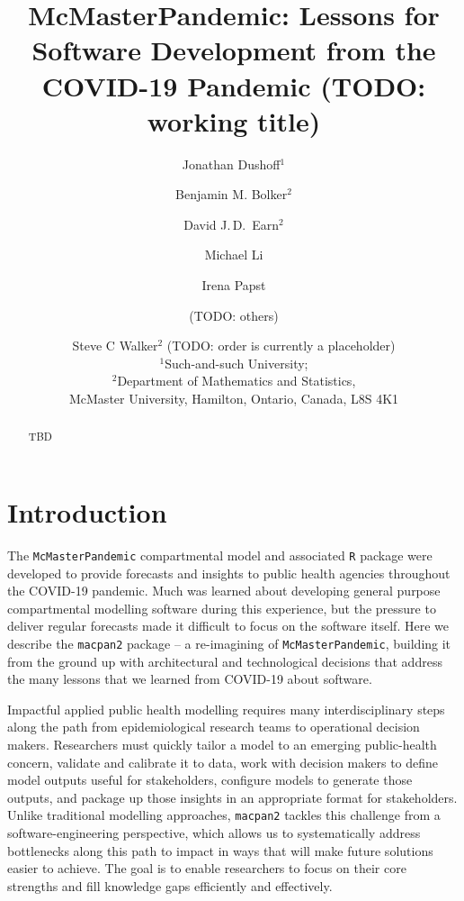 \documentclass[12pt]{article}\usepackage[]{graphicx}\usepackage[]{xcolor}
\title{McMasterPandemic: Lessons for Software Development from the COVID-19 Pandemic (TODO: working title)}
\author{Jonathan Dushoff$^1$ \and Benjamin M. Bolker$^2$ \and David J.\,D.\ Earn$^2$ \and Michael Li \and Irena Papst \and (TODO: others) \and Steve C Walker$^2$ (TODO: order is currently a placeholder) \\
  $^1$Such-and-such University;\\
  $^2$Department of Mathematics and Statistics,\\
  McMaster University, Hamilton, Ontario, Canada, L8S 4K1
  \\
  \medskip
  \spewmoddates
}
\begin{document}
\maketitle

\linenumbers

\begin{abstract}
  TBD
\end{abstract}



\section{Introduction}\label{sec:intro}

The \texttt{McMasterPandemic} compartmental model and associated \texttt{R} package were developed to provide forecasts and insights to public health agencies throughout the COVID-19 pandemic. Much was learned about developing general purpose compartmental modelling software during this experience, but the pressure to deliver regular forecasts made it difficult to focus on the software itself. Here we describe the \texttt{macpan2} package -- a re-imagining of \texttt{McMasterPandemic}, building it from the ground up with architectural and technological decisions that address the many lessons that we learned from COVID-19 about software.

Impactful applied public health modelling requires many interdisciplinary steps along the path from epidemiological research teams to operational decision makers. Researchers must quickly tailor a model to an emerging public-health concern, validate and calibrate it to data, work with decision makers to define model outputs useful for stakeholders, configure models to generate those outputs, and package up those insights in an appropriate format for stakeholders. Unlike traditional modelling approaches, \texttt{macpan2} tackles this challenge from a software-engineering perspective, which allows us to systematically address bottlenecks along this path to impact in ways that will make future solutions easier to achieve. The goal is to enable researchers to focus on their core strengths and fill knowledge gaps efficiently and effectively.
\end{document}
